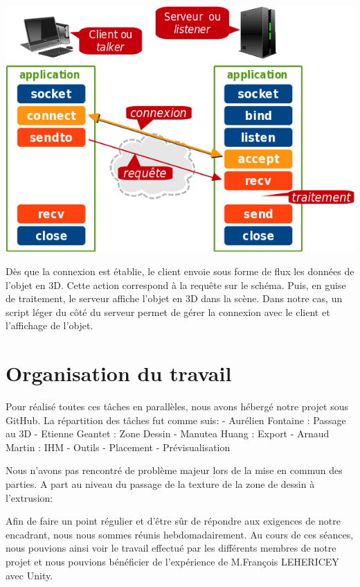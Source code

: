\documentclass[a4paper,11pt]{article}
\begin{document}
			
			\centerline{\includegraphics[scale=1]{images/tcp-socket.png}}
			
			Dès que la connexion est établie, le client envoie sous forme de flux les données de l'objet en 3D. Cette action correspond à la requête sur le schéma. Puis, en guise de traitement, le serveur affiche l'objet en 3D dans la scène.
			Dans notre cas, un script léger du côté du serveur permet de gérer la connexion avec le client et l'affichage de l'objet.
			
	\section{Organisation du travail}
				
				Pour réalisé toutes ces tâches en parallèles, nous avons hébergé notre projet sous GitHub. La répartition des tâches fut comme suis:
				- Aurélien Fontaine : Passage au 3D
				- Etienne Geantet : Zone Dessin
				- Manutea Huang : Export
				- Arnaud Martin : IHM - Outils - Placement - Prévisualisation
			
				Nous n'avons pas rencontré de problème majeur lors de la mise en commun des parties. A part au niveau du passage de la texture de la zone de dessin à l'extrusion:
			
				Afin de faire un point régulier et d'être sûr de répondre aux exigences de notre encadrant, nous nous sommes réunis hebdomadairement. Au cours de ces séances, nous pouvions ainsi voir le travail effectué par les différents membres de notre projet et nous pouvions bénéficier de l'expérience de M.François LEHERICEY avec Unity.
				
\end{document}
